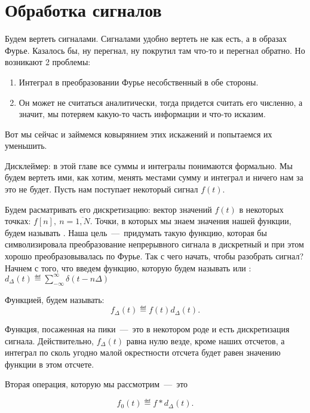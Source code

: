 \documentclass[main.tex]{subfiles}
\begin{document}
\section{Обработка сигналов}

Будем вертеть сигналами.
Сигналами удобно вертеть не как есть, а в образах Фурье.
Казалось бы, ну перегнал, ну покрутил там что-то и перегнал обратно.
Но возникают 2 проблемы:
\begin{enumerate}
    \item Интеграл в преобразовании Фурье несобственный в обе стороны.
    \item Он может не считаться аналитически, тогда придется считать его численно, а значит, мы потеряем какую-то часть информации и что-то исказим.
\end{enumerate} 
Вот мы сейчас и займемся ковырянием этих искажений и попытаемся их уменьшить.

Дисклеймер: в этой главе все суммы и интегралы понимаются формально.
Мы будем вертеть ими, как хотим, менять местами сумму и интеграл и ничего нам за это не будет.
Пусть нам поступает некоторый сигнал $f(t)$. 

Будем расматривать его дискретизацию: вектор значений $f(t)$ в некоторых точках: $f[n],\ n=\overline{1,N}$.
Точки, в которых мы знаем  значения нашей функции, будем называть .
Наша цель~---~придумать такую функцию, которая бы символизировала преобразование непрерывного сигнала в дискретный и при этом хорошо преобразовывалась по Фурье.
Так с чего начать, чтобы разобрать сигнал?
Начнем с того, что введем функцию, которую будем называть 
или : 
$d_\Delta(t) \eqdef \sum\limits_{-\infty}^{\infty} \delta(t - n\Delta)$

\begin{Def}\label{def:sitOnLance}
    Функцией,  будем называть:
    \begin{equation}
        f_\Delta(t) \eqdef f(t)d_\Delta(t)
    .\end{equation} 
\end{Def}

Функция, посаженная на пики~---~это в некотором роде и есть дискретизация сигнала.
Действительно, $f_\Delta(t)$ равна нулю везде, кроме наших отсчетов,
а интеграл по сколь угодно малой окрестности отсчета будет равен значению функции в этом отсчете.

Вторая операция, которую мы рассмотрим~---~это 
\begin{Def}\label{def:convolFence}
    \[
        f_0(t) \eqdef f * d_\Delta(t)
    .\] 
\end{Def} 
\end{document}
